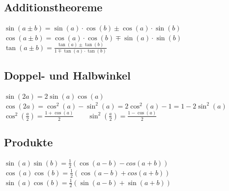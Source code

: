 \begin{minipage}[t]{9cm}
	\subsection{Additionstheoreme}
	$\sin(a \pm b)=\sin(a) \cdot \cos(b) \pm \cos(a) \cdot \sin(b)$\\
	$\cos(a \pm b)=\cos(a) \cdot \cos(b) \mp \sin(a) \cdot \sin(b)$\\	
	$\tan(a \pm b)=\frac{\tan(a) \pm \tan(b)}{1 \mp \tan(a) \cdot \tan(b)}$
	
	\subsection{Doppel- und Halbwinkel}	
	$\sin(2a)=2\sin(a)\cos(a)$\\
	$\cos(2a)=\cos^2(a)-\sin^2(a)=2\cos^2(a)-1=1-2\sin^2(a)$\\
	$\cos^2 \left(\frac{a}{2}\right)=\frac{1+\cos(a)}{2} \qquad
	\sin^2 \left(\frac{a}{2}\right)=\frac{1-\cos(a)}{2}$
	
	\subsection{Produkte}
	$\sin(a)\sin(b)=\frac{1}{2}(\cos(a-b)-cos(a+b))$\\
	$\cos(a)\cos(b)=\frac{1}{2}(\cos(a-b)+cos(a+b))$\\
	$\sin(a)\cos(b)=\frac{1}{2}(\sin(a-b)+\sin(a+b))$	
\end{minipage}
